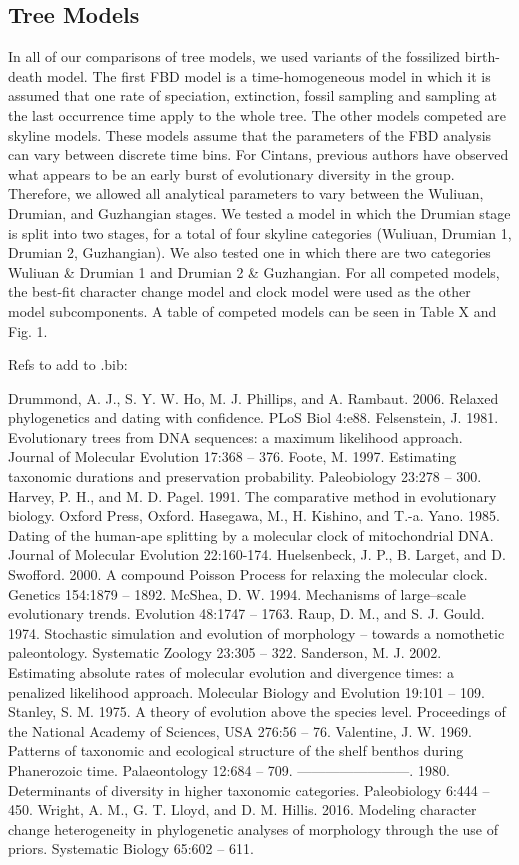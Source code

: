 \documentclass{article}
\begin{document}
\subsection{Tree Models}

In all of our comparisons of tree models, we used variants of the fossilized birth-death model.
The first FBD model is a time-homogeneous model in which it is assumed that one rate of speciation, extinction, fossil sampling and sampling at the last occurrence time apply to the whole tree.
The other models competed are skyline models.
These models assume that the parameters of the FBD analysis can vary between discrete time bins.
For Cintans, previous authors have observed what appears to be an early burst of evolutionary diversity in the group.
Therefore, we allowed all analytical parameters to vary between the Wuliuan, Drumian, and Guzhangian stages.
We tested a model in which the Drumian stage is split into two stages, for a total of four skyline categories (Wuliuan, Drumian 1, Drumian 2, Guzhangian).
We also tested one in which there are two categories Wuliuan \& Drumian 1 and Drumian 2 \& Guzhangian. 
For all competed models, the best-fit character change model and clock model were used as the other model subcomponents.
A table of competed models can be seen in Table X and Fig. 1.


Refs to add to .bib:

Drummond, A. J., S. Y. W. Ho, M. J. Phillips, and A. Rambaut.  2006.  Relaxed phylogenetics and dating with confidence.  PLoS Biol 4:e88. 
Felsenstein, J.  1981.  Evolutionary trees from DNA sequences: a maximum likelihood approach.  Journal of Molecular Evolution 17:368 – 376. 
Foote, M.  1997.  Estimating taxonomic durations and preservation probability.  Paleobiology 23:278 – 300.
Harvey, P. H., and M. D. Pagel.  1991.  The comparative method in evolutionary biology.  Oxford Press, Oxford.   
Hasegawa, M., H. Kishino, and T.-a. Yano.  1985.  Dating of the human-ape splitting by a molecular clock of mitochondrial DNA.  Journal of Molecular Evolution 22:160-174. 
Huelsenbeck, J. P., B. Larget, and D. Swofford.  2000.  A compound Poisson Process for relaxing the molecular clock.  Genetics 154:1879 – 1892. 
McShea, D. W.  1994.  Mechanisms of large–scale evolutionary trends.  Evolution 48:1747 – 1763.
Raup, D. M., and S. J. Gould.  1974.  Stochastic simulation and evolution of morphology – towards a nomothetic paleontology.  Systematic Zoology 23:305 – 322. 
Sanderson, M. J.  2002.  Estimating absolute rates of molecular evolution and divergence times: a penalized likelihood approach.  Molecular Biology and Evolution 19:101 – 109. 
Stanley, S. M.  1975.  A theory of evolution above the species level.  Proceedings of the National Academy of Sciences, USA 276:56 – 76. 
Valentine, J. W.  1969.  Patterns of taxonomic and ecological structure of the shelf benthos during Phanerozoic time.  Palaeontology 12:684 – 709. 
————————.  1980.  Determinants of diversity in higher taxonomic categories.  Paleobiology 6:444 – 450. 
Wright, A. M., G. T. Lloyd, and D. M. Hillis.  2016.  Modeling character change heterogeneity in phylogenetic analyses of morphology through the use of priors.  Systematic Biology 65:602 – 611.


 

\end{document}
